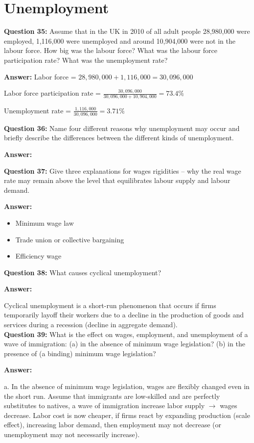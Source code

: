 \documentclass[a4paper, 11pt]{article}
\begin{document}
\section{Unemployment}
\textbf{Question 35:} Assume that in the UK in 2010 of all adult people 28,980,000 were employed, 1,116,000 were unemployed and around 10,904,000 were not in the labour force. How big was the labour force? What was the labour force participation rate? What was the unemployment rate?

\textbf{Answer:}
Labor force = $28,980,000 + 1,116,000 = 30,096,000$

Labor force participation rate = $\frac{30,096,000}{30,096,000 + 10,904,000} = 73.4\%$

Unemployment rate = $\frac{1,116,000}{30,096,000} = 3.71\%$ 

\textbf{Question 36:} Name four different reasons why unemployment may occur and briefly describe the differences between the different kinds of unemployment.

\textbf{Answer:}

\textbf{Question 37:} Give three explanations for wages rigidities – why the real wage rate may remain above the level that equilibrates labour supply and labour demand.

\textbf{Answer:}
\begin{itemize}
\item Minimum wage law
\item Trade union or collective bargaining
\item Efficiency wage
\end{itemize}

\textbf{Question 38:} What causes cyclical unemployment? 

\textbf{Answer:}

Cyclical unemployment is a short-run phenomenon that occurs if firms temporarily layoff their workers due to a decline in the production of goods and services during a recession (decline in aggregate demand). \\

\textbf{Question 39:} What is the effect on wages, employment, and unemployment of a wave of immigration: (a) in the absence of minimum wage legislation? (b) in the presence of (a binding) minimum wage legislation?

\textbf{Answer:}

a. In the absence of minimum wage legislation, wages are flexibly changed even in the short run. Assume that immigrants are low-skilled and are perfectly substitutes to natives, a wave of immigration increase labor supply $\rightarrow$ wages decrease. Labor cost is now cheaper, if firms react by expanding production (scale effect), increasing labor demand, then employment may not decrease (or unemployment may not necessarily increase).
\end{document}
